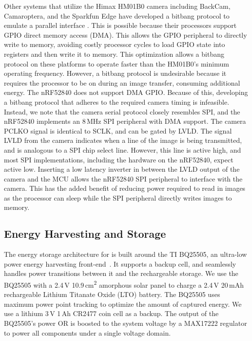 Other systems that utilize the Himax HM01B0 camera including BackCam, Camaroptera, and the Sparkfun Edge have developed a bitbang protocol to emulate a parallel interface \cite{josephson2019wireless, nardello2019camaroptera, sparkfunedge}. This is possible because their processors support GPIO direct memory access (DMA). This allows the GPIO peripheral to directly write to memory, avoiding costly processor cycles to load GPIO state into registers and then write it to memory. This optimization allows a bitbang protocol on these platforms to operate faster than the HM01B0's minimum operating frequency. However, a bitbang protocol is undesirable because it requires the processor to be on during an image transfer, consuming additional energy. The nRF52840 does not support DMA GPIO. Because of this, developing a bitbang protocol that adheres to the required camera timing is infeasible. Instead, we note that the camera serial protocol closely resembles SPI, and the nRF52840 implements an 8\,MHz SPI peripheral with DMA support. The camera PCLKO signal is identical to SCLK, and can be gated by LVLD. The signal LVLD from the camera indicates when a line of the image is being transmitted, and is analogous to a SPI chip select line. However, this line is active high, and most SPI implementations, including the hardware on the nRF52840, expect active low. Inserting a low latency inverter in between the LVLD output of the camera and the MCU allows the nRF52840 SPI peripheral to interface with the camera. This has the added benefit of reducing power required to read in images as the processor can sleep while the SPI peripheral directly writes images to memory.

\subsection{Energy Harvesting and Storage}
The energy storage architecture for \namec{} is built around the TI BQ25505, an ultra-low power energy harvesting front-end~\cite{bq25505}. It supports a backup cell, and seamlessly handles power transitions between it and the rechargeable storage. We use the BQ25505 with a 2.4\,V 10.9\,cm\textsuperscript{2} amorphous solar panel to charge a 2.4\,V 20\,mAh rechargeable Lithium Titanate Oxide (LTO) battery. The BQ25505 uses maximum power point tracking to optimize the amount of captured energy. We use a lithium 3\,V 1\,Ah CR2477 coin cell as a backup. The output of the BQ25505's power OR is boosted to the system voltage by a MAX17222 regulator to power all components under a single voltage domain.

